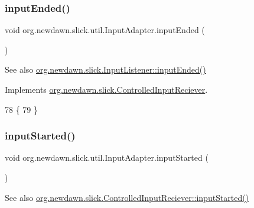 \subsubsection{\texorpdfstring{input\+Ended()}{inputEnded()}}
{\footnotesize\ttfamily void org.\+newdawn.\+slick.\+util.\+Input\+Adapter.\+input\+Ended (\begin{DoxyParamCaption}{ }\end{DoxyParamCaption})\hspace{0.3cm}{\ttfamily [inline]}}

\begin{DoxySeeAlso}{See also}
\mbox{\hyperlink{interfaceorg_1_1newdawn_1_1slick_1_1_controlled_input_reciever_a61c6cde7cbf28a6969cafe3ec4f1c121}{org.\+newdawn.\+slick.\+Input\+Listener\+::input\+Ended()}} 
\end{DoxySeeAlso}


Implements \mbox{\hyperlink{interfaceorg_1_1newdawn_1_1slick_1_1_controlled_input_reciever_a61c6cde7cbf28a6969cafe3ec4f1c121}{org.\+newdawn.\+slick.\+Controlled\+Input\+Reciever}}.


\begin{DoxyCode}
78                              \{
79     \}
\end{DoxyCode}
\mbox{\label{classorg_1_1newdawn_1_1slick_1_1util_1_1_input_adapter_aabb9bfda05a319feefe6598b6153e2df}} 
\subsubsection{\texorpdfstring{input\+Started()}{inputStarted()}}
{\footnotesize\ttfamily void org.\+newdawn.\+slick.\+util.\+Input\+Adapter.\+input\+Started (\begin{DoxyParamCaption}{ }\end{DoxyParamCaption})\hspace{0.3cm}{\ttfamily [inline]}}

\begin{DoxySeeAlso}{See also}
\mbox{\hyperlink{interfaceorg_1_1newdawn_1_1slick_1_1_controlled_input_reciever_a718de21e9cd22f4c48ee87b5b8b32ed6}{org.\+newdawn.\+slick.\+Controlled\+Input\+Reciever\+::input\+Started()}} 
\end{DoxySeeAlso}


